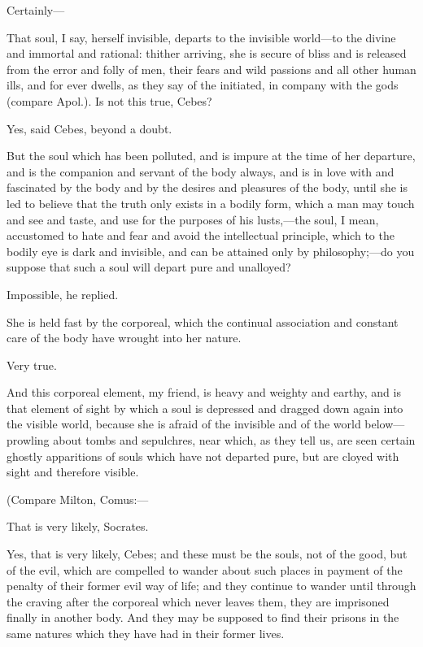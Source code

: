 \documentclass[11pt,letter]{article}
\begin{document}
\par  Certainly—

\par  That soul, I say, herself invisible, departs to the invisible world—to the divine and immortal and rational: thither arriving, she is secure of bliss and is released from the error and folly of men, their fears and wild passions and all other human ills, and for ever dwells, as they say of the initiated, in company with the gods (compare Apol.). Is not this true, Cebes?

\par  Yes, said Cebes, beyond a doubt.

\par  But the soul which has been polluted, and is impure at the time of her departure, and is the companion and servant of the body always, and is in love with and fascinated by the body and by the desires and pleasures of the body, until she is led to believe that the truth only exists in a bodily form, which a man may touch and see and taste, and use for the purposes of his lusts,—the soul, I mean, accustomed to hate and fear and avoid the intellectual principle, which to the bodily eye is dark and invisible, and can be attained only by philosophy;—do you suppose that such a soul will depart pure and unalloyed?

\par  Impossible, he replied.

\par  She is held fast by the corporeal, which the continual association and constant care of the body have wrought into her nature.

\par  Very true.

\par  And this corporeal element, my friend, is heavy and weighty and earthy, and is that element of sight by which a soul is depressed and dragged down again into the visible world, because she is afraid of the invisible and of the world below—prowling about tombs and sepulchres, near which, as they tell us, are seen certain ghostly apparitions of souls which have not departed pure, but are cloyed with sight and therefore visible.

\par  (Compare Milton, Comus:—
 
\par  That is very likely, Socrates.

\par  Yes, that is very likely, Cebes; and these must be the souls, not of the good, but of the evil, which are compelled to wander about such places in payment of the penalty of their former evil way of life; and they continue to wander until through the craving after the corporeal which never leaves them, they are imprisoned finally in another body. And they may be supposed to find their prisons in the same natures which they have had in their former lives.
\end{document}
